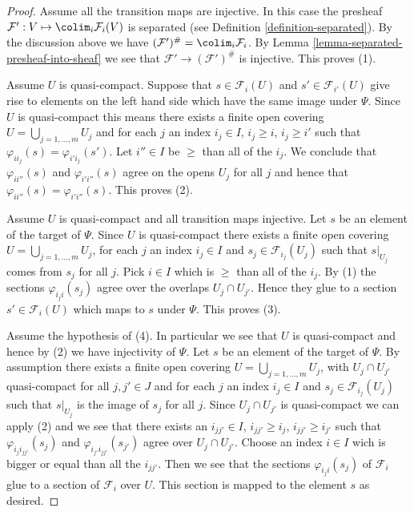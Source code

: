 \begin{proof}
Assume all the transition maps are injective. In this case the presheaf
$\mathcal{F}' : V \mapsto \colim_i \mathcal{F}_i(V)$ is
separated (see Definition \ref{definition-separated}).
By the discussion above we have
$(\mathcal{F}')^\# = \colim_i \mathcal{F}_i$.
By Lemma \ref{lemma-separated-presheaf-into-sheaf} we see that
$\mathcal{F}' \to (\mathcal{F}')^\#$ is injective. This proves (1).

\medskip\noindent
Assume $U$ is quasi-compact.
Suppose that $s \in \mathcal{F}_i(U)$ and
$s' \in \mathcal{F}_{i'}(U)$ give rise to elements on
the left hand side which have the same image under $\Psi$.
Since $U$ is quasi-compact this means there exists
a finite open covering $U = \bigcup_{j = 1, \ldots, m} U_j$
and for each $j$ an index $i_j \in I$, $i_j \geq i$, $i_j \geq i'$
such that $\varphi_{ii_j}(s) = \varphi_{i'i_j}(s')$.
Let $i''\in I$ be $\geq$ than all of the $i_j$.
We conclude that $\varphi_{ii''}(s)$ and $\varphi_{i'i''}(s)$
agree on the opens $U_j$ for all $j$ and hence that
$\varphi_{ii''}(s) = \varphi_{i'i''}(s)$. This proves (2).

\medskip\noindent
Assume $U$ is quasi-compact and all transition maps injective.
Let $s$ be an element of the target of $\Psi$.
Since $U$ is quasi-compact
there exists a finite open covering $U = \bigcup_{j = 1, \ldots, m} U_j$,
for each $j$ an index $i_j \in I$ and $s_j \in \mathcal{F}_{i_j}(U_j)$
such that $s|_{U_j}$ comes from $s_j$ for all $j$.
Pick $i \in I$ which is $\geq$ than all of the $i_j$.
By (1) the sections $\varphi_{i_ji}(s_j)$ agree over the
overlaps $U_j \cap U_{j'}$. Hence they glue to a section
$s' \in \mathcal{F}_i(U)$ which maps to $s$ under $\Psi$.
This proves (3).

\medskip\noindent
Assume the hypothesis of (4). In particular we see that
$U$ is quasi-compact and hence by (2) we have injectivity of $\Psi$.
Let $s$ be an element of the target of $\Psi$.
By assumption there  exists a finite open covering
$U = \bigcup_{j = 1, \ldots, m} U_j$, with $U_j \cap U_{j'}$
quasi-compact for all $j, j' \in J$ and
for each $j$ an index $i_j \in I$ and $s_j \in \mathcal{F}_{i_j}(U_j)$
such that $s|_{U_j}$ is the image of $s_j$ for all $j$.
Since $U_j \cap U_{j'}$ is quasi-compact we can apply (2)
and we see that there exists an $i_{jj'} \in I$,
$i_{jj'} \geq i_j$, $i_{jj'} \geq i_{j'}$ such that
$\varphi_{i_ji_{jj'}}(s_j)$ and $\varphi_{i_{j'}i_{jj'}}(s_{j'})$
agree over $U_j \cap U_{j'}$. Choose an index $i \in I$
wich is bigger or equal than all the $i_{jj'}$. Then we see that
the sections $\varphi_{i_ji}(s_j)$ of $\mathcal{F}_i$ glue
to a section of $\mathcal{F}_i$ over $U$. This section is mapped
to the element $s$ as desired.
\end{proof}


